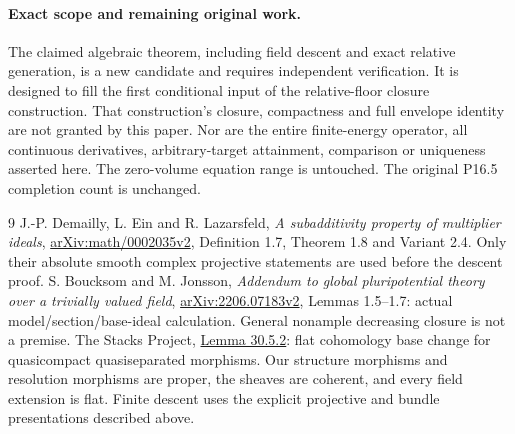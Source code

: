 \documentclass[10pt]{article}
\begin{document}
\paragraph{Exact scope and remaining original work.}
The claimed algebraic theorem, including field descent and exact
relative generation, is a new candidate and requires independent
verification. It is designed to fill the first conditional input of
the relative-floor closure construction. That construction's closure,
compactness and full envelope identity are not granted by this paper.
Nor are the entire finite-energy operator, all continuous derivatives,
arbitrary-target attainment, comparison or uniqueness asserted here.
The zero-volume equation range is untouched. The original P16.5
completion count is unchanged.

\begin{thebibliography}{9}
 J.-P. Demailly, L. Ein and R. Lazarsfeld,
\emph{A subadditivity property of multiplier ideals},
\href{https://arxiv.org/html/math/0002035v2}{arXiv:math/0002035v2},
Definition 1.7, Theorem 1.8 and Variant 2.4. Only their absolute smooth
complex projective statements are used before the descent proof.
 S. Boucksom and M. Jonsson,
\emph{Addendum to global pluripotential theory over a trivially valued field},
\href{https://arxiv.org/pdf/2206.07183v2}{arXiv:2206.07183v2},
Lemmas 1.5--1.7: actual model/section/base-ideal calculation.
General nonample decreasing closure is not a premise.
 The Stacks Project,
\href{https://stacks.math.columbia.edu/tag/02KH}{Lemma 30.5.2}:
flat cohomology base change for quasicompact quasiseparated morphisms.
Our structure morphisms and resolution morphisms are proper, the
sheaves are coherent, and every field extension is flat. Finite descent
uses the explicit projective and bundle presentations described above.
\end{thebibliography}
\end{document}
